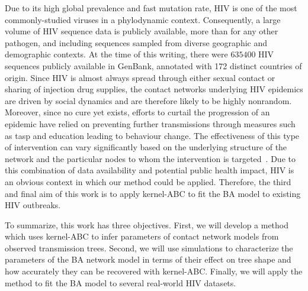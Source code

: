 Due to its high global prevalence and fast mutation rate, \gls{HIV} is one of
the most commonly-studied viruses in a phylodynamic context. Consequently, a
large volume of \gls{HIV} sequence data is publicly available, more than for
any other pathogen, and including sequences sampled from diverse geographic and
demographic contexts. At the time of this writing, there were $635400$ HIV
sequences publicly available in GenBank, annotated with 172 distinct countries
of origin. Since \gls{HIV} is almost always spread through either sexual
contact or sharing of injection drug supplies, the contact networks underlying
\gls{HIV} epidemics are driven by social dynamics and are therefore likely to
be highly nonrandom. Moreover, since no cure yet exists, efforts to curtail the
progression of an epidemic have relied on preventing further transmissions
through measures such as \gls{tasp} and education leading to behaviour change.
The effectiveness of this type of intervention can vary significantly based on
the underlying structure of the network and the particular nodes to whom the
intervention is targeted~\autocite{little2014using,wang2015targeting}. Due to
this combination of data availability and potential public health impact,
\gls{HIV} is an obvious context in which our method could be applied.
Therefore, the third and final aim of this work is to apply kernel-\gls{ABC} to
fit the \gls{BA} model to existing \gls{HIV} outbreaks.

To summarize, this work has three objectives. First, we will develop a method
which uses kernel-\gls{ABC} to infer parameters of contact network models from
observed transmission trees. Second, we will use simulations to characterize
the parameters of the \gls{BA} network model in terms of their effect on tree
shape and how accurately they can be recovered with kernel-\gls{ABC}. Finally,
we will apply the method to fit the \gls{BA} model to several real-world
\gls{HIV} datasets.

